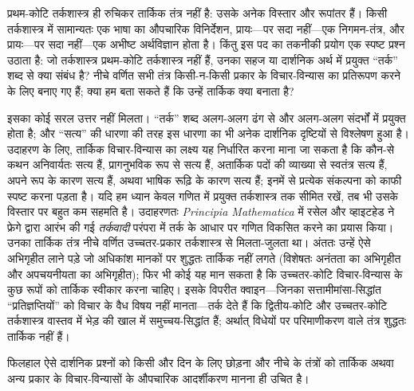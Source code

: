 \documentclass[../../../include/open-logic-section]{subfiles}
\begin{document}


प्रथम-कोटि तर्कशास्त्र ही रुचिकर तार्किक तंत्र नहीं है: उसके अनेक
विस्तार और रूपांतर हैं। किसी तर्कशास्त्र में सामान्यतः एक भाषा का औपचारिक
विनिर्देशन, प्रायः---पर सदा नहीं---एक निगमन-तंत्र, और प्रायः---पर सदा
नहीं---एक अभीष्ट अर्थविज्ञान होता है। किंतु इस पद का तकनीकी प्रयोग एक
स्पष्ट प्रश्न उठाता है: जो तर्कशास्त्र प्रथम-कोटि तर्कशास्त्र नहीं हैं,
उनका सहज या दार्शनिक अर्थ में प्रयुक्त ``तर्क'' शब्द से क्या संबंध है?
नीचे वर्णित सभी तंत्र किसी-न-किसी प्रकार के विचार-विन्यास का प्रतिरूपण
करने के लिए बनाए गए हैं; क्या हम बता सकते हैं कि उन्हें तार्किक क्या बनाता
है?

इसका कोई सरल उत्तर नहीं मिलता। ``तर्क'' शब्द अलग-अलग ढंग से और अलग-अलग
संदर्भों में प्रयुक्त होता है; और ``सत्य'' की धारणा की तरह इस धारणा का भी
अनेक दार्शनिक दृष्टियों से विश्लेषण हुआ है। उदाहरण के लिए, तार्किक
विचार-विन्यास का लक्ष्य यह निर्धारित करना माना जा सकता है कि कौन-से कथन
अनिवार्यतः सत्य हैं, प्रागनुभविक रूप से सत्य हैं, अतार्किक पदों की व्याख्या
से स्वतंत्र सत्य हैं, अपने रूप के कारण सत्य हैं, अथवा भाषिक रूढ़ि के कारण
सत्य हैं; इनमें से प्रत्येक संकल्पना को काफी स्पष्ट करना पड़ता है। यदि हम
ध्यान केवल गणित में प्रयुक्त तर्कशास्त्र तक सीमित रखें, तब भी उसके विस्तार
पर बहुत कम सहमति है। उदाहरणतः \textit{Principia Mathematica} में रसेल और
व्हाइटहेड ने फ्रेगे द्वारा आरंभ की गई {\em तर्कवादी} परंपरा में तर्क के
आधार पर गणित विकसित करने का प्रयास किया। उनका तार्किक तंत्र नीचे वर्णित
उच्चतर-प्रकार तर्कशास्त्र से मिलता-जुलता था। अंततः उन्हें ऐसे अभिगृहीत
लाने पड़े जो अधिकांश मानकों पर शुद्धतः तार्किक नहीं लगते (विशेषतः अनंतता
का अभिगृहीत और अपचयनीयता का अभिगृहीत); फिर भी कोई यह मान सकता है कि
उच्चतर-कोटि विचार-विन्यास के कुछ रूपों को तार्किक स्वीकार करना चाहिए। इसके
विपरीत क्वाइन---जिनका सत्तामीमांसा-सिद्धांत ``प्रतिज्ञप्तियों'' को विचार के
वैध विषय नहीं मानता---तर्क देते हैं कि द्वितीय-कोटि और उच्चतर-कोटि
तर्कशास्त्र वास्तव में भेड़ की खाल में समुच्चय-सिद्धांत हैं; अर्थात् विधेयों
पर परिमाणीकरण वाले तंत्र शुद्धतः तार्किक नहीं हैं।

फिलहाल ऐसे दार्शनिक प्रश्नों को किसी और दिन के लिए छोड़ना और नीचे के
तंत्रों को तार्किक अथवा अन्य प्रकार के विचार-विन्यासों के औपचारिक आदर्शीकरण
मानना ही उचित है।
\end{document}
